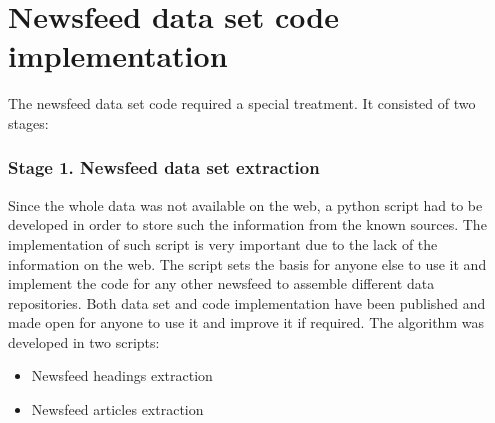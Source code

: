 \section{Newsfeed data set code implementation}
The newsfeed data set code required a special treatment. It consisted of two stages:

\subsubsection{Stage 1. Newsfeed data set extraction}

Since the whole data was not available on the web, a python script had to be developed in order to store such the information from the known sources. The implementation of such script is very important due to the lack of the information on the web. The script sets the basis for anyone else to use it and implement the code for any other newsfeed to assemble different data repositories. Both data set and code implementation have been published and made open for anyone to use it and improve it if required. The algorithm was developed in two scripts:
\begin{itemize}
    \item Newsfeed headings extraction
    \item Newsfeed articles extraction
\end{itemize}

